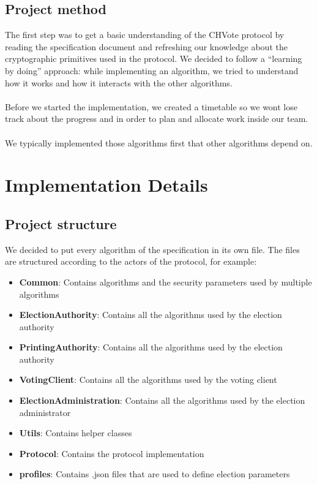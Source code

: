 \documentclass[a4paper,12pt]{report}
\theoremstyle{definition}
\begin{document}
\section{Project method}
The first step was to get a basic understanding of the CHVote protocol by reading the specification document and refreshing our knowledge about the cryptographic primitives used in the protocol. We decided to follow a "`learning by doing"' approach: while implementing an algorithm, we tried to understand how it works and how it interacts with the other algorithms.
\\\\
\noindent Before we started the implementation, we created a timetable so we wont lose track about the progress and in order to plan and allocate work inside our team.
\\\\\noindent We typically implemented those algorithms first that other algorithms depend on.

\chapter{Implementation Details}
\section{Project structure}
We decided to put every algorithm of the specification in its own file. The files are structured according to the actors of the protocol, for example:
\begin{itemize}
	\item \textbf{Common}: Contains algorithms and the security parameters used by multiple algorithms
	\item \textbf{ElectionAuthority}: Contains all the algorithms used by the election authority
	\item \textbf{PrintingAuthority}: Contains all the algorithms used by the election authority
	\item \textbf{VotingClient}: Contains all the algorithms used by the voting client
	\item \textbf{ElectionAdministration}: Contains all the algorithms used by the election administrator
	\item \textbf{Utils}: Contains helper classes
	\item \textbf{Protocol}: Contains the protocol implementation
	\item \textbf{profiles}: Contains .json files that are used to define election parameters	
\end{itemize}
\end{document}

